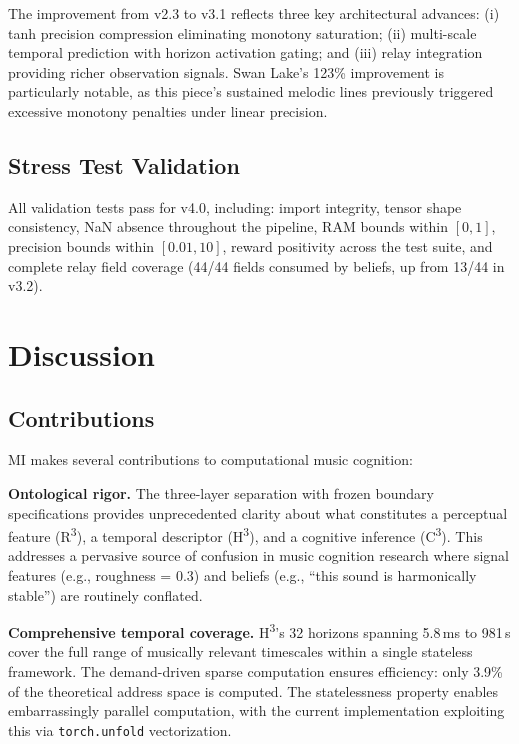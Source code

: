 \documentclass[10pt,twocolumn]{article}
\newcommand{\Rcube}{R\textsuperscript{3}}
\newcommand{\Hcube}{H\textsuperscript{3}}
\newcommand{\Ccube}{C\textsuperscript{3}}
\begin{document}
The improvement from v2.3 to v3.1 reflects three key architectural advances:
(i) tanh precision compression eliminating monotony saturation;
(ii) multi-scale temporal prediction with horizon activation gating;
and (iii) relay integration providing richer observation signals.
Swan Lake's 123\% improvement is particularly notable, as this piece's sustained melodic lines previously triggered excessive monotony penalties under linear precision.

\subsection{Stress Test Validation}

All validation tests pass for v4.0, including:
import integrity, tensor shape consistency, NaN absence throughout the pipeline,
RAM bounds within $[0, 1]$, precision bounds within $[0.01, 10]$,
reward positivity across the test suite,
and complete relay field coverage (44/44 fields consumed by beliefs, up from 13/44 in v3.2).

\section{Discussion}
\label{sec:discussion}

\subsection{Contributions}

MI makes several contributions to computational music cognition:

\textbf{Ontological rigor.}
The three-layer separation with frozen boundary specifications provides unprecedented clarity about what constitutes a perceptual feature (\Rcube{}), a temporal descriptor (\Hcube{}), and a cognitive inference (\Ccube{}).
This addresses a pervasive source of confusion in music cognition research where signal features (e.g., roughness = 0.3) and beliefs (e.g., ``this sound is harmonically stable'') are routinely conflated.

\textbf{Comprehensive temporal coverage.}
\Hcube{}'s 32 horizons spanning 5.8\,ms to 981\,s cover the full range of musically relevant timescales within a single stateless framework.
The demand-driven sparse computation ensures efficiency: only 3.9\% of the theoretical address space is computed.
The statelessness property enables embarrassingly parallel computation, with the current implementation exploiting this via \texttt{torch.unfold} vectorization.
\end{document}
